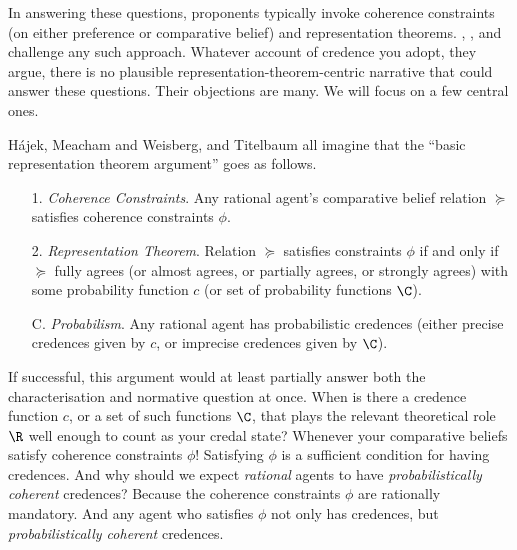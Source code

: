 In answering these questions, proponents typically invoke coherence constraints (on either preference or comparative belief) and representation theorems. \citet{Hajek2009b}, \citet{Meacham2011}, and \citet{Titelbaum2015} challenge any such approach. Whatever account of credence you adopt, they argue, there is no plausible representation-theorem-centric narrative that could answer these questions. Their objections are many. We will focus on a few central ones.

H\'ajek, Meacham and Weisberg, and Titelbaum all imagine that the ``basic representation theorem argument'' goes as follows.
\begin{enumerate}
\item[1.] \textit{Coherence Constraints}. Any rational agent's comparative belief relation $\succeq$ satisfies coherence constraints $\phi$. 
\item[2.] \textit{Representation Theorem}. Relation $\succeq$ satisfies constraints $\phi$ if and only if $\succeq$ fully agrees (or almost agrees, or partially agrees, or strongly agrees) with some probability function $c$ (or set of probability functions $\C$).
\item[C.] \textit{Probabilism}. Any rational agent has probabilistic credences (either precise credences given by $c$, or imprecise credences given by $\C$).
\end{enumerate}
If successful, this argument would at least partially answer both the characterisation and normative question at once. When is there a credence function $c$, or a set of such functions $\C$, that plays the relevant theoretical role $\R$ well enough to count as your credal state? Whenever your comparative beliefs satisfy coherence constraints $\phi$! Satisfying $\phi$ is a sufficient condition for having credences. And why should we expect \textit{rational} agents to have \textit{probabilistically coherent} credences? Because the coherence constraints $\phi$ are rationally mandatory. And any agent who satisfies $\phi$ not only has credences, but \textit{probabilistically coherent} credences.

